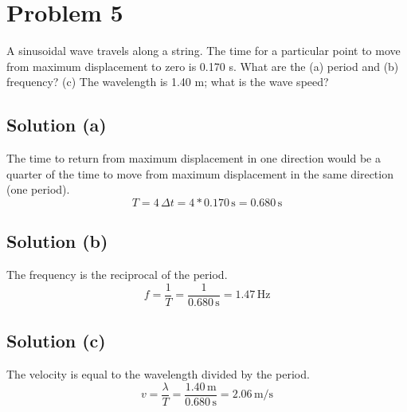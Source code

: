 \documentclass[12pt]{article}
\begin{document}
    \pagebreak
    \section{Problem 5}
        A sinusoidal wave travels along a string. 
        The time for a particular point to move from maximum displacement to zero is 0.170 s.
        What are the (a) period and (b) frequency? 
        (c) The wavelength is 1.40 m; what is the wave speed?

        \subsection{Solution (a)}
            The time to return from maximum displacement in one direction would be a quarter of the time to move from maximum displacement in the same direction (one period). 
            \begin{equation}
                T   =   4\,\Delta t
                    =   4 * 0.170\,\unit{\second}
                    =   \boxed{0.680\,\unit{\second}}
            \end{equation}

        \subsection{Solution (b)}
            The frequency is the reciprocal of the period. 
            \begin{equation}
                f   =   \frac{1}{T}
                    =   \frac{1}{0.680\,\unit{\second}}
                    =   \boxed{1.47\,\unit{\hertz}}
            \end{equation}

        \subsection{Solution (c)}
            The velocity is equal to the wavelength divided by the period.
            \begin{equation}
                v   =   \frac{\lambda}{T}
                    =   \frac{1.40\,\unit{\meter}}{0.680\,\unit{\second}}
                    =   \boxed{2.06\,\unit{\meter/\second}}
            \end{equation}

    \pagebreak
\end{document}
